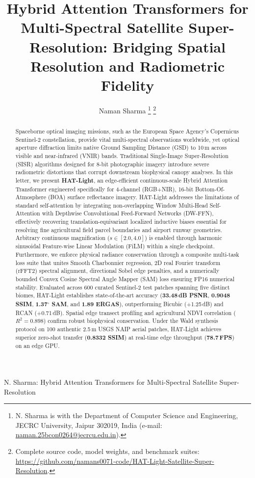 \documentclass[letterpaper,journal,twoside]{IEEEtran}
\begin{document}
\title{Hybrid Attention Transformers for Multi-Spectral Satellite Super-Resolution: Bridging Spatial Resolution and Radiometric Fidelity}

\author{Naman Sharma%
\thanks{N. Sharma is with the Department of Computer Science and Engineering, JECRC University, Jaipur 302019, India (e-mail: \mbox{\href{mailto:naman.25bcon0264@jecrcu.edu.in}{naman.25bcon0264@jecrcu.edu.in}}).}%
\thanks{Complete source code, model weights, and benchmark suites: \url{https://github.com/namans0071-code/HAT-Light-Satellite-Super-Resolution}.}%
}

%
{N. Sharma: Hybrid Attention Transformers for Multi-Spectral Satellite Super-Resolution}

\maketitle

\begin{abstract}
Spaceborne optical imaging missions, such as the European Space Agency's Copernicus Sentinel-2 constellation, provide vital multi-spectral observations worldwide, yet optical aperture diffraction limits native Ground Sampling Distance (GSD) to 10\,m across visible and near-infrared (VNIR) bands. Traditional Single-Image Super-Resolution (SISR) algorithms designed for 8-bit photographic imagery introduce severe radiometric distortions that corrupt downstream biophysical canopy analyses. In this letter, we present \textbf{HAT-Light}, an edge-efficient continuous-scale Hybrid Attention Transformer engineered specifically for 4-channel (RGB+NIR), 16-bit Bottom-Of-Atmosphere (BOA) surface reflectance imagery. HAT-Light addresses the limitations of standard self-attention by integrating non-overlapping Window Multi-Head Self-Attention with Depthwise Convolutional Feed-Forward Networks (DW-FFN), effectively recovering translation-equivariant localized inductive biases essential for resolving fine agricultural field parcel boundaries and airport runway geometries. Arbitrary continuous magnification ($s \in [2.0, 4.0]$) is enabled through harmonic sinusoidal Feature-wise Linear Modulation (FiLM) within a single checkpoint. Furthermore, we enforce physical radiance conservation through a composite multi-task loss suite that unites Smooth Charbonnier regression, 2D real Fourier transform (rFFT2) spectral alignment, directional Sobel edge penalties, and a numerically bounded Convex Cosine Spectral Angle Mapper (SAM) loss ensuring FP16 numerical stability. Evaluated across 600 curated Sentinel-2 test patches spanning five distinct biomes, HAT-Light establishes state-of-the-art accuracy (\textbf{33.48\,dB PSNR}, \textbf{0.9048 SSIM}, \textbf{1.37$^\circ$ SAM}, and \textbf{1.89 ERGAS}), outperforming Bicubic (+1.25\,dB) and RCAN (+0.71\,dB). Spatial edge transect profiling and agricultural NDVI correlation ($R^2 = 0.898$) confirm robust biophysical conservation. Under the Wald synthesis protocol on 100 authentic 2.5\,m USGS NAIP aerial patches, HAT-Light achieves superior zero-shot transfer (\textbf{0.8332 SSIM}) at real-time edge throughput (\textbf{78.7\,FPS}) on an edge GPU.
\end{abstract}
\end{document}
